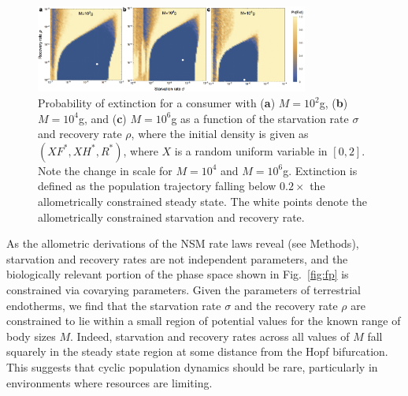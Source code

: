 \documentclass[twocolumn,preprintnumbers,amsmath,amssymb,superscriptaddress]{revtex4}
\begin{document}



\begin{figure}
\centering
\includegraphics[width=0.8\textwidth]{fig_ExtinctionAllometricComb3.eps}
\caption{\small{ Probability of extinction for a consumer with ({\bf a}) $M=10^2$g, ({\bf b}) $M=10^4$g, and ({\bf c}) $M=10^6$g as a function of the starvation rate $\sigma$ and recovery rate $\rho$, where the initial density is given as $(XF^*,XH^*,R^*)$, where $X$ is a random uniform variable in $[0,2]$. Note the change in scale for $M=10^4$ and $M=10^6$g.  Extinction is defined as the population trajectory falling below $0.2\times$ the allometrically constrained steady state. The white points denote the allometrically constrained starvation and recovery rate.}\label{fig:ext}}
\end{figure}

As the allometric derivations of the NSM rate laws reveal (see Methods), starvation and recovery rates are not independent parameters, and the biologically relevant portion of the phase space shown in Fig.~\ref{fig:fp} is constrained via covarying parameters.
Given the parameters of terrestrial endotherms, we find that the starvation rate $\sigma$ and the recovery rate $\rho$ are constrained to lie within a small region of potential values for the known range of body sizes $M$.
Indeed, starvation and recovery rates across all values of $M$ fall squarely in the steady state region at some distance from the Hopf bifurcation. 
This suggests that cyclic population dynamics should be rare, particularly in environments where resources are limiting.
\end{document}
